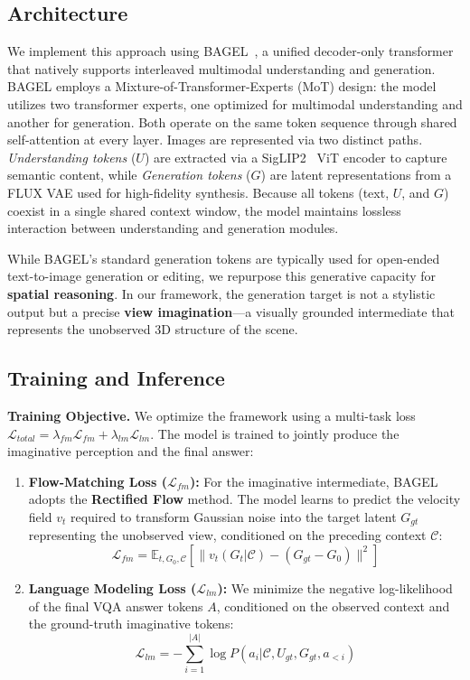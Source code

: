 \documentclass{llmxive}
\begin{document}
\subsection{Architecture}
We implement this approach using BAGEL~\cite{deng2025bagel}, a unified decoder-only transformer that natively supports interleaved multimodal understanding and generation.
BAGEL employs a {Mixture-of-Transformer-Experts (MoT)} design: 
the model utilizes two transformer experts, one optimized for multimodal understanding and another for generation.
Both operate on the same token sequence through shared self-attention at every layer.
Images are represented via two distinct paths. \textit{Understanding tokens} ($U$) are extracted via a SigLIP2~\cite{tschannen2025siglip} ViT encoder to capture semantic content, while \textit{Generation tokens} ($G$) are latent representations from a FLUX VAE used for high-fidelity synthesis.
Because all tokens (text, $U$, and $G$) coexist in a single shared context window, the model maintains lossless interaction between understanding and generation modules.


While BAGEL's standard generation tokens are typically used for open-ended text-to-image generation or editing, we repurpose this generative capacity for \textbf{spatial reasoning}. In our framework, the generation target is not a stylistic output but a precise \textbf{view imagination}---a visually grounded intermediate that represents the unobserved 3D structure of the scene.



\subsection{Training and Inference}

\noindent\textbf{Training Objective.}
We optimize the framework using a multi-task loss $\mathcal{L}_{total} = \lambda_{fm} \mathcal{L}_{fm} + \lambda_{lm} \mathcal{L}_{lm}$. The model is trained to jointly produce the imaginative perception and the final answer:
\begin{enumerate}
    \item \textbf{Flow-Matching Loss ($\mathcal{L}_{fm}$):} For the imaginative intermediate, BAGEL adopts the \textbf{Rectified Flow} method. The model learns to predict the velocity field $v_t$ required to transform Gaussian noise into the target latent $G_{gt}$ representing the unobserved view, conditioned on the preceding context $\mathcal{C}$:
    \begin{equation}
        \mathcal{L}_{fm} = \mathbb{E}_{t, G_0, \mathcal{C}} \left[ \| v_t(G_t | \mathcal{C}) - (G_{gt} - G_0) \|^2 \right]
    \end{equation}
    \item \textbf{Language Modeling Loss ($\mathcal{L}_{lm}$):} We minimize the negative log-likelihood of the final VQA answer tokens $A$, conditioned on the observed context and the ground-truth imaginative tokens:
    \begin{equation}
        \mathcal{L}_{lm} = - \sum_{i=1}^{|A|} \log P(a_i | \mathcal{C}, U_{gt}, G_{gt}, a_{<i})
    \end{equation}
\end{enumerate}
\end{document}
